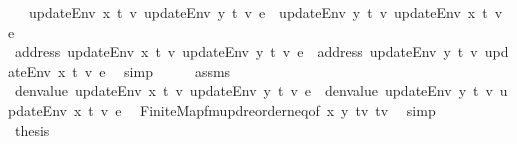 \begin{isabellebody}
\ \ \ {\isachardoublequoteopen}updateEnv\ x\ t{}\ v{}\ {\isacharparenleft}{\kern0pt}updateEnv\ y\ t{}\ v{}\ e{\isacharparenright}{\kern0pt}\ {\isacharequal}{\kern0pt}\ updateEnv\ y\ t{}\ v{}\ {\isacharparenleft}{\kern0pt}updateEnv\ x\ t{}\ v{}\ e{\isacharparenright}{\kern0pt}{\isachardoublequoteclose}\isanewline
%
\isadelimproof
%
\endisadelimproof
%
\isatagproof
{}\isamarkupfalse%
\ {\isacharminus}{\kern0pt}\isanewline
\ \ \isamarkupfalse%
\ {\isachardoublequoteopen}address\ {\isacharparenleft}{\kern0pt}updateEnv\ x\ t{}\ v{}\ {\isacharparenleft}{\kern0pt}updateEnv\ y\ t{}\ v{}\ e{\isacharparenright}{\kern0pt}{\isacharparenright}{\kern0pt}\ {\isacharequal}{\kern0pt}\ address\ {\isacharparenleft}{\kern0pt}updateEnv\ y\ t{}\ v{}\ {\isacharparenleft}{\kern0pt}updateEnv\ x\ t{}\ v{}\ e{\isacharparenright}{\kern0pt}{\isacharparenright}{\kern0pt}{\isachardoublequoteclose}\ \isamarkupfalse%
\ simp\isanewline
\ \ \isamarkupfalse%
\ \isamarkupfalse%
\ assms\ \isamarkupfalse%
\ {\isachardoublequoteopen}denvalue\ {\isacharparenleft}{\kern0pt}updateEnv\ x\ t{}\ v{}\ {\isacharparenleft}{\kern0pt}updateEnv\ y\ t{}\ v{}\ e{\isacharparenright}{\kern0pt}{\isacharparenright}{\kern0pt}\ {\isacharequal}{\kern0pt}\ denvalue\ {\isacharparenleft}{\kern0pt}updateEnv\ y\ t{}\ v{}\ {\isacharparenleft}{\kern0pt}updateEnv\ x\ t{}\ v{}\ e{\isacharparenright}{\kern0pt}{\isacharparenright}{\kern0pt}{\isachardoublequoteclose}\ \isamarkupfalse%
\ Finite{\isacharunderscore}{\kern0pt}Map{\isachardot}{\kern0pt}fmupd{\isacharunderscore}{\kern0pt}reorder{\isacharunderscore}{\kern0pt}neq{\isacharbrackleft}{\kern0pt}of\ x\ y\ {\isachardoublequoteopen}{\isacharparenleft}{\kern0pt}t{}{\isacharcomma}{\kern0pt}v{}{\isacharparenright}{\kern0pt}{\isachardoublequoteclose}\ {\isachardoublequoteopen}{\isacharparenleft}{\kern0pt}t{}{\isacharcomma}{\kern0pt}v{}{\isacharparenright}{\kern0pt}{\isachardoublequoteclose}{\isacharbrackright}{\kern0pt}\ \isamarkupfalse%
\ simp\isanewline
\ \ \isamarkupfalse%
\ \isamarkupfalse%
\ {\isacharquery}{\kern0pt}thesis\ \isamarkupfalse%

\end{isabellebody}
